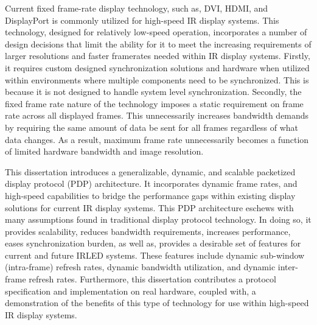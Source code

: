 Current fixed frame-rate display technology, such as, DVI, HDMI, and DisplayPort is commonly utilized for high-speed IR display systems. This technology, designed for relatively low-speed operation, incorporates a number of design decisions that limit the ability for it to meet the increasing requirements of larger resolutions and faster framerates needed within IR display systems. Firstly, it requires custom designed synchronization solutions and hardware when utilized within environments where multiple components need to be synchronized. This is because it is not designed to handle system level synchronization. Secondly, the fixed frame rate nature of the technology imposes a static requirement on frame rate across all displayed frames. This unnecessarily increases bandwidth demands by requiring the same amount of data be sent for all frames regardless of what data changes. As a result, maximum frame rate unnecessarily becomes a function of limited hardware bandwidth and image resolution.

This dissertation introduces a generalizable, dynamic, and scalable packetized display protocol (PDP) architecture. It incorporates dynamic frame rates, and high-speed capabilities to bridge the performance gaps within existing display solutions for current IR display systems. This PDP architecture eschews with many assumptions found in traditional display protocol technology. In doing so, it provides scalability, reduces bandwidth requirements, increases performance, eases synchronization burden, as well as, provides a desirable set of features for current and future IRLED systems. These features include dynamic sub-window (intra-frame) refresh rates, dynamic bandwidth utilization, and dynamic inter-frame refresh rates. Furthermore, this dissertation contributes a protocol specification and implementation on real hardware, coupled with, a demonstration of the benefits of this type of technology for use within high-speed IR display systems.
